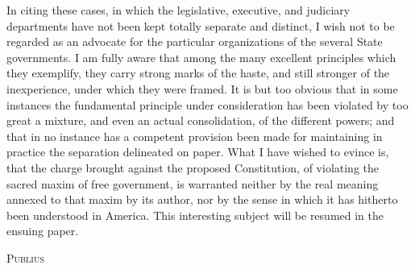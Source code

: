 In citing these cases, in which the legislative, executive, and judiciary departments have not been kept totally separate and distinct, I wish not to be regarded as an advocate for the particular organizations of the several State governments. I am fully aware that among the many excellent principles which they exemplify, they carry strong marks of the haste, and still stronger of the inexperience, under which they were framed. It is but too obvious that in some instances the fundamental principle under consideration has been violated by too great a mixture, and even an actual consolidation, of the different powers; and that in no instance has a competent provision been made for maintaining in practice the separation delineated on paper. What I have wished to evince is, that the charge brought against the proposed Constitution, of violating the sacred maxim of free government, is warranted neither by the real meaning annexed to that maxim by its author, nor by the sense in which it has hitherto been understood in America. This interesting subject will be resumed in the ensuing paper.

\vspace{.5cm}
\textsc{Publius}
